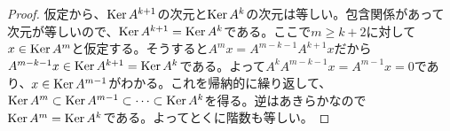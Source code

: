 \newpage

\subsubsection{} %
\begin{proof}
  仮定から、$\operatorname{Ker} A^{k+1}$の次元と$\operatorname{Ker} A^k$の次元は等しい。包含関係があって次元が等しいので、$\operatorname{Ker} A^{k+1} = \operatorname{Ker} A^k$である。ここで$m \geq k +2$に対して$x \in \operatorname{Ker} A^m$と仮定する。そうすると$A^m x = A^{m-k-1} A^{k+1} x$だから$A^{m-k-1} x \in \operatorname{Ker} A^{k+1} = \operatorname{Ker} A^k$である。よって$A^k A^{m-k-1} x = A^{m-1} x = 0$であり、$x \in \operatorname{Ker} A^{m-1}$がわかる。これを帰納的に繰り返して、
  $\operatorname{Ker} A^m \subset \operatorname{Ker} A^{m-1} \subset \cdots \subset \operatorname{Ker} A^k$を得る。逆はあきらかなので$\operatorname{Ker} A^m = \operatorname{Ker} A^k$である。よってとくに階数も等しい。
\end{proof}
